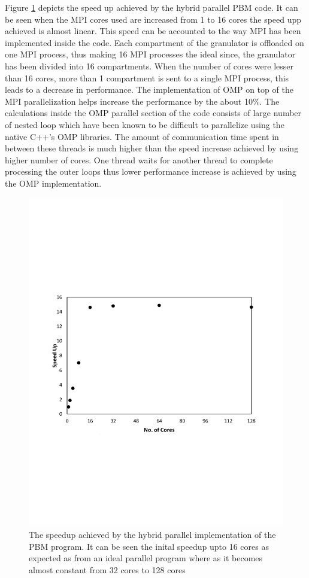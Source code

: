 \documentclass[preprint,11pt,authoryear]{elsarticle}
\begin{document}
Figure \ref{fig:rslts_PBM_speed_up} depicts the speed up achieved by the hybrid parallel PBM code. It 
can be seen when the MPI cores used are increased from 1 to 16 cores the speed upp achieved is 
almost linear. This speed can be accounted to the way MPI has been implemented inside the code. 
Each compartment of the granulator is  offloaded on one MPI process, thus making 16 MPI processes 
the ideal since, the granulator has been divided into 16 compartments. When the number of cores 
were lesser than 16 cores, more than 1 compartment is sent to a single MPI process, this leads to a 
decrease in performance. The implementation of OMP on top of the MPI parallelization helps increase 
the performance by the about 10\%. The calculations inside the OMP parallel section of the code 
consists of large number of nested loop which have been known to be difficult to parallelize 
\citep{He2016} using the native C++'s OMP libraries. The amount of communication time spent in 
between these threads is much higher than the speed increase achieved by using higher number of 
cores. One thread waits for another thread to complete processing the outer loops thus lower 
performance increase is achieved by using the OMP implementation. \\

\begin{figure}[H]
\centering
\includegraphics[scale=0.7]{rslts_PBM_Speed_Up.pdf}
\caption{The speedup achieved by the hybrid parallel implementation of the PBM program. It can be 
seen the inital speedup upto 16 cores as expected as from an ideal parallel program where as it 
becomes almost constant from 32 cores to 128 cores}
\label{fig:rslts_PBM_speed_up}
\end{figure}
\end{document}
